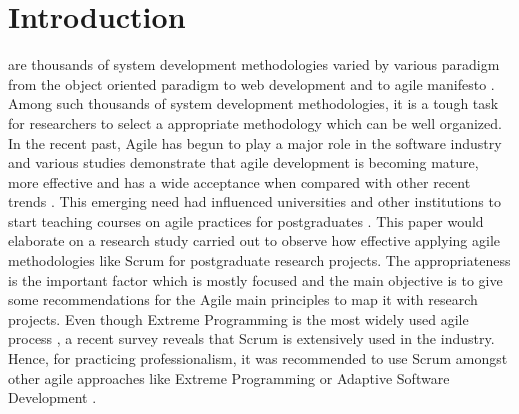 
\section{Introduction}\label{sec:introduction}
 are thousands of system development methodologies varied by various paradigm from the object oriented paradigm to web development and to agile manifesto \cite{Strode2003}. Among such thousands of system development methodologies, it is a tough task for researchers to select a appropriate methodology which can be well organized. In the recent past, Agile has begun to play a major role in the software industry \cite{5765710} and various studies demonstrate that agile development is becoming mature, more effective and has a wide acceptance when compared with other recent trends \cite{ExecutiveBrief.2011} \cite{El-Abbassy2010}. This emerging need had influenced universities and other institutions to start teaching courses on agile practices for postgraduates \cite{Mann2006}. This paper would elaborate on a research study carried out to observe how effective applying agile methodologies like Scrum for postgraduate research projects. The appropriateness is the important factor which is mostly focused and the main objective is to give some recommendations for the Agile main principles to map it with research projects. Even though Extreme Programming is the most widely used agile process \cite{Pressman:2009:SEP:1593949}, a recent survey reveals that Scrum \cite{5765710} \cite{Schwaber:2001:ASD:559553} \cite{8442128} is extensively used in the industry. Hence, for practicing professionalism, it was recommended to use Scrum \cite{8442128} \cite{agilemanifesto} amongst other agile approaches like Extreme Programming \cite{agilemanifesto} or Adaptive Software Development \cite{Schwaber:2001:ASD:559553} \cite{agilemanifesto}. 